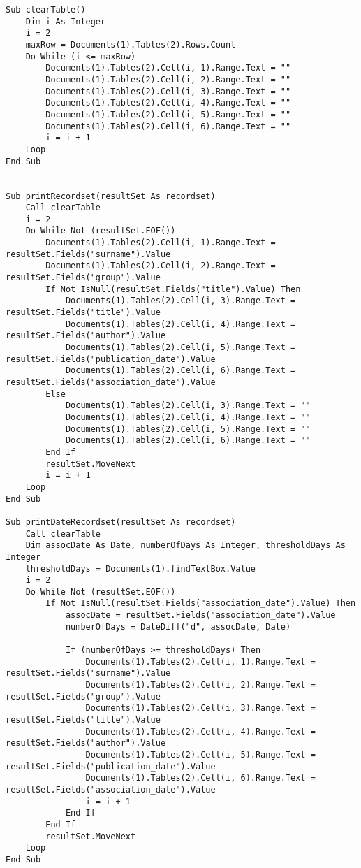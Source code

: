 \begin{lstlisting}[caption=VBA code]
Sub clearTable()
    Dim i As Integer
    i = 2
    maxRow = Documents(1).Tables(2).Rows.Count
    Do While (i <= maxRow)
        Documents(1).Tables(2).Cell(i, 1).Range.Text = ""
        Documents(1).Tables(2).Cell(i, 2).Range.Text = ""
        Documents(1).Tables(2).Cell(i, 3).Range.Text = ""
        Documents(1).Tables(2).Cell(i, 4).Range.Text = ""
        Documents(1).Tables(2).Cell(i, 5).Range.Text = ""
        Documents(1).Tables(2).Cell(i, 6).Range.Text = ""
        i = i + 1
    Loop
End Sub


Sub printRecordset(resultSet As recordset)
    Call clearTable
    i = 2
    Do While Not (resultSet.EOF())
        Documents(1).Tables(2).Cell(i, 1).Range.Text = resultSet.Fields("surname").Value
        Documents(1).Tables(2).Cell(i, 2).Range.Text = resultSet.Fields("group").Value
        If Not IsNull(resultSet.Fields("title").Value) Then
            Documents(1).Tables(2).Cell(i, 3).Range.Text = resultSet.Fields("title").Value
            Documents(1).Tables(2).Cell(i, 4).Range.Text = resultSet.Fields("author").Value
            Documents(1).Tables(2).Cell(i, 5).Range.Text = resultSet.Fields("publication_date").Value
            Documents(1).Tables(2).Cell(i, 6).Range.Text = resultSet.Fields("association_date").Value
        Else
            Documents(1).Tables(2).Cell(i, 3).Range.Text = ""
            Documents(1).Tables(2).Cell(i, 4).Range.Text = ""
            Documents(1).Tables(2).Cell(i, 5).Range.Text = ""
            Documents(1).Tables(2).Cell(i, 6).Range.Text = ""
        End If
        resultSet.MoveNext
        i = i + 1
    Loop
End Sub

Sub printDateRecordset(resultSet As recordset)
    Call clearTable
    Dim assocDate As Date, numberOfDays As Integer, thresholdDays As Integer
    thresholdDays = Documents(1).findTextBox.Value 
    i = 2
    Do While Not (resultSet.EOF())
        If Not IsNull(resultSet.Fields("association_date").Value) Then
            assocDate = resultSet.Fields("association_date").Value
            numberOfDays = DateDiff("d", assocDate, Date)
            
            If (numberOfDays >= thresholdDays) Then
                Documents(1).Tables(2).Cell(i, 1).Range.Text = resultSet.Fields("surname").Value
                Documents(1).Tables(2).Cell(i, 2).Range.Text = resultSet.Fields("group").Value
                Documents(1).Tables(2).Cell(i, 3).Range.Text = resultSet.Fields("title").Value
                Documents(1).Tables(2).Cell(i, 4).Range.Text = resultSet.Fields("author").Value
                Documents(1).Tables(2).Cell(i, 5).Range.Text = resultSet.Fields("publication_date").Value
                Documents(1).Tables(2).Cell(i, 6).Range.Text = resultSet.Fields("association_date").Value
                i = i + 1
            End If
        End If
        resultSet.MoveNext
    Loop
End Sub


\end{lstlisting}
